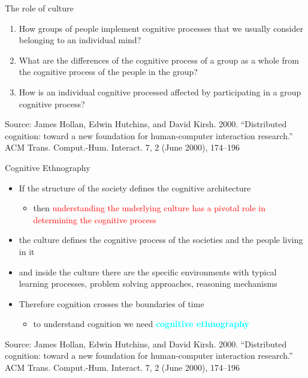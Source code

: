 \documentclass{beamer}
\begin{document}
\begin{frame}
{\centerline{The role of culture}}

\begin{enumerate}
\item How groups of people implement cognitive processes that we usually consider belonging to an individual mind?\newline
    \item What are the differences of the cognitive process of a group as a whole from the cognitive process of the people in the group?\newline
    \item How is an individual cognitive processed affected by participating in a group cognitive process?\newline
\end{enumerate}

\begin{center}
    \tiny{Source: James Hollan, Edwin Hutchins, and David Kirsh. 2000. ``Distributed cognition: toward a new foundation for human-computer interaction research.'' ACM Trans. Comput.-Hum. Interact. 7, 2 (June 2000), 174–196}
\end{center}

\end{frame}

\begin{frame}
{\centerline{Cognitive Ethnography}}

\begin{itemize}
\item If the structure of the society defines the cognitive architecture
\begin{itemize}
\item then \textcolor{red}{understanding the underlying culture has a pivotal role in determining the cognitive process}
\end{itemize}
\item the culture defines the cognitive process of the societies and the people living in it
\item and inside the culture there are the specific environments with typical learning processes, problem solving approaches, reasoning mechanisms
\item Therefore cognition crosses the boundaries of time
\begin{itemize}
\item to understand cognition we need \textcolor{cyan}{\textbf{cognitive ethnography}}
\end{itemize}
\end{itemize}


\begin{center}
    \tiny{Source: James Hollan, Edwin Hutchins, and David Kirsh. 2000. ``Distributed cognition: toward a new foundation for human-computer interaction research.'' ACM Trans. Comput.-Hum. Interact. 7, 2 (June 2000), 174–196}
\end{center}

\end{frame}
\end{document}
